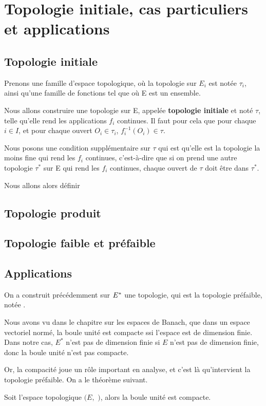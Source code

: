 \section{Topologie initiale, cas particuliers et applications}

\subsection{Topologie initiale}

Prenons une famille
 d'espace topologique, où la topologie sur $E_{i}$ est notée
$\tau_{i}$, ainsi qu'une famille de fonctions  tel que
 où E est un ensemble.

Nous allons construire une topologie sur E, appelée \textbf{topologie initiale}
et noté $\tau$, telle qu'elle rend les applications $f_{i}$ continues. Il faut pour cela que
pour chaque $i \in I$, et pour chaque ouvert $O_{i} \in \tau_{i}$,
$f_{i}^{-1}(O_{i}) \in \tau$.

Nous posons une condition supplémentaire sur $\tau$ qui est qu'elle est la
topologie la moins fine qui rend les $f_{i}$ continues, c'est-à-dire que si on
prend une autre topologie $\tau^{*}$ sur E qui rend les $f_{i}$ continues, chaque
ouvert de $\tau$ doit être dans $\tau^{*}$.

Nous allons alors définir 

\subsection{Topologie produit}

\subsection{Topologie faible et préfaible}

\subsection{Applications}

On a construit précédemment sur $E^{*}$ une topologie, qui est la topologie
préfaible, notée .

Nous avons vu dans le chapitre sur les espaces de Banach, que dans un espace
vectoriel normé, la boule unité est compacte ssi l'espace est de dimension
finie. Dans notre cas, $E^{*}$ n'est pas de dimension finie si $E$ n'est pas de
dimension finie, donc la boule unité n'est pas compacte.

Or, la compacité joue un rôle important en analyse, et c'est là qu'intervient la topologie préfaible. On a le théorème suivant.

\begin{theorem}
	Soit l'espace topologique $(E,$ $)$, alors la boule unité
	est compacte.
\end{theorem}
